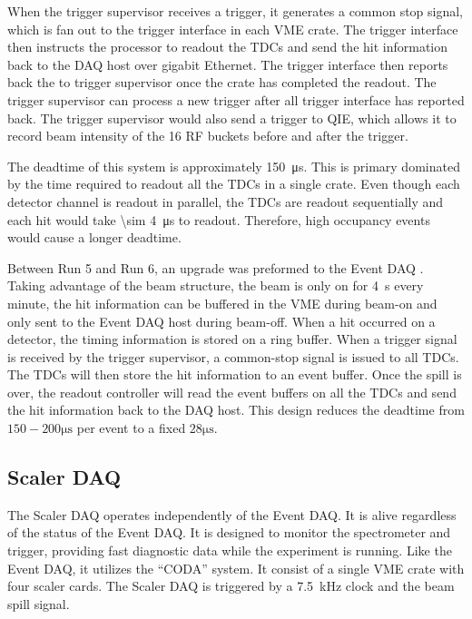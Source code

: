 \documentclass[../main.tex]{subfiles}
\begin{document}
When the trigger supervisor receives a trigger, it generates a common stop signal, which is fan out
to the trigger interface in each VME crate. The trigger interface then instructs the processor to readout the TDCs
and send the hit information back to the DAQ host over gigabit Ethernet. The trigger interface then
reports back the to trigger supervisor once the crate has completed the readout. The trigger supervisor can process
a new trigger after all trigger interface has reported back. The trigger supervisor would also send a trigger to QIE,
which allows it to record beam intensity of the 16 RF buckets before and after the trigger.

The deadtime of this system is approximately \SI{150}{\micro\second}. This is primary
dominated by the time required to readout all the TDCs in a single crate. Even though
each detector channel is readout in parallel, the TDCs are readout sequentially
and each hit would take \SI{\sim 4}{\micro\second} to readout. Therefore, high occupancy
events would cause a longer deadtime.

Between Run 5 and Run 6, an upgrade was preformed to the Event DAQ \cite{Kun-1724}.
Taking advantage of the beam structure, the beam is only on for \SI{4}{\s} every minute,
the hit information can be buffered in the VME during beam-on and only sent to the Event
DAQ host during beam-off. When a hit occurred on a detector,
the timing information is stored on a ring buffer.
When a trigger signal is received by the trigger supervisor,
a common-stop signal is issued to all TDCs. The TDCs will then store the hit information
to an event buffer. Once the spill is over, the readout controller will read the event
buffers on all the TDCs and send the hit information back to the DAQ host.
This design reduces the deadtime from $150 -200\unit{\micro\second}$ per event to a fixed $28\unit{\micro\second}$.

\subsection{Scaler DAQ}
The Scaler DAQ operates independently of the Event DAQ.
It is alive regardless of the status of the Event DAQ.
It is designed to monitor the spectrometer and trigger,
providing fast diagnostic data while the experiment is running. Like the Event DAQ,
it utilizes the ``CODA'' system. It consist of a single VME crate with four scaler
cards. The Scaler DAQ is triggered by a \SI{7.5}{\kilo\hertz} clock and the beam
spill signal.
\end{document}
